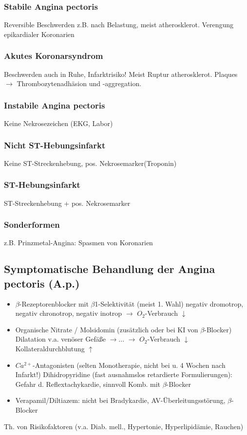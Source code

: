 \documentclass[10pt,a4paper]{report}
\begin{document}
\subsubsection{Stabile Angina pectoris} Reversible Beschwerden z.B. nach Belastung, meist atherosklerot. Verengung epikardialer Koronarien
\subsubsection{Akutes Koronarsyndrom}Beschwerden auch in Ruhe, Infarktrisiko! Meist Ruptur atherosklerot. Plaques $\rightarrow$ Thrombozytenadhäsion und -aggregation.

\subsubsection{Instabile Angina pectoris} Keine Nekrosezeichen (EKG, Labor)

\subsubsection{Nicht ST-Hebungsinfarkt} Keine ST-Streckenhebung, pos. Nekrosemarker(Troponin)

\subsubsection{ST-Hebungsinfarkt} ST-Streckenhebung + pos. Nekrosemarker

\subsubsection{Sonderformen} z.B. Prinzmetal-Angina: Spasmen von Koronarien
\subsection{Symptomatische Behandlung der Angina pectoris (A.p.)}
\begin{itemize}
	\item $\beta$-Rezeptorenblocker mit $\beta$1-Selektivität (meist 1. Wahl) negativ dromotrop, negativ chronotrop, negativ inotrop $\rightarrow$ $O_2$-Verbrauch $\downarrow$
	\item Organische Nitrate / Molsidomin (zusätzlich oder bei KI von $\beta$-Blocker) Dilatation v.a. venöser Gefäße  $\rightarrow$... $\rightarrow$ $O_2$-Verbrauch $\downarrow$ Kollateraldurchblutung $\uparrow$
	\item $Ca^{2+}$-Antagonisten (selten Monotherapie, nicht bei u. 4 Wochen nach Infarkt!) Dihidropyridine (fast ausnahmslos retardierte Formulierungen): Gefahr d. Reflextachykardie, sinnvoll Komb. mit $\beta$-Blocker 
	\item Verapamil/Diltiazem: nicht bei Bradykardie, AV-Überleitungsstörung, $\beta$-Blocker 
\end{itemize}
Th. von Risikofaktoren (v.a. Diab. mell., Hypertonie, Hyperlipidämie, Rauchen) 
\end{document}
